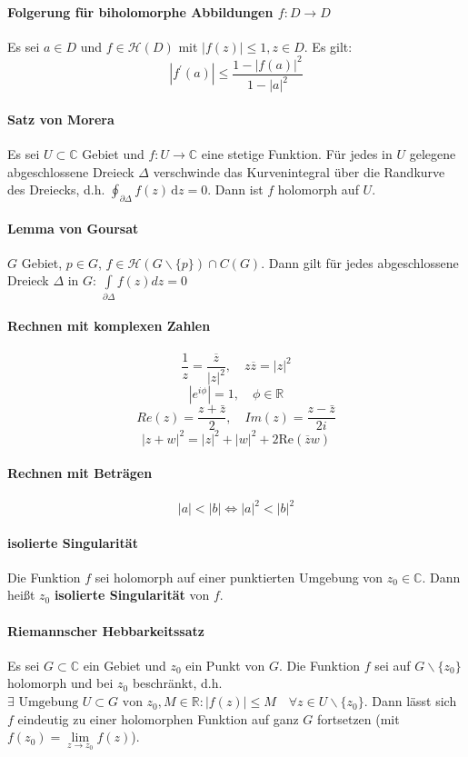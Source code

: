 \documentclass[a4paper, 10pt, DIV20, headings=small]{scrartcl}
\theoremstyle{definition}
\theoremstyle{plain}
\begin{document}
\paragraph{Folgerung für biholomorphe Abbildungen $f \colon D \rightarrow D$}
Es sei $a \in D$ und $f \in \mathcal{H}(D)$ mit $|f(z)| \leq 1, z \in D$. Es gilt:
$$|f^\prime(a)| \leq \frac{1 - |f(a)|^2}{1 - |a|^2}$$

\paragraph{Satz von Morera}
Es sei $U \subset \mathbb{C}$ Gebiet und $f \colon U \rightarrow \mathbb{C}$ eine stetige Funktion. Für jedes in $U$ gelegene abgeschlossene Dreieck $\Delta$ verschwinde das Kurvenintegral über die Randkurve des Dreiecks, d.h. $\oint_{\partial\Delta} f(z)\, \mathrm{d}z = 0$. Dann ist $f$ holomorph auf $U$.

\paragraph{Lemma von Goursat}
$G$ Gebiet, $p \in G$, $f \in \mathcal{H}(G \backslash\{p\}) \cap C(G)$. Dann gilt für jedes abgeschlossene Dreieck $\Delta$ in $G$:
$\int\limits_{\partial \Delta}{f(z)dz} = 0$

\paragraph{Rechnen mit komplexen Zahlen}
$$\frac{1}{z} = \frac{\overline{z}}{|z|^2}, \quad z \overline{z} = |z|^2$$
$$|e^{i \phi}| = 1, \quad \phi \in \mathbb{R}$$
$$Re(z) = \frac{z+\bar{z}}{2}, \quad Im(z) = \frac{z-\bar{z}}{2i}$$
$$|z+w|^2 = |z|^2+|w|^2 + 2 \text{Re}(\overline{z}w)$$

\paragraph{Rechnen mit Beträgen}
$$|a| < |b| \Leftrightarrow |a|^2 < |b|^2$$

\paragraph{isolierte Singularität}
Die Funktion $f$ sei holomorph auf einer punktierten Umgebung von
$z_0 \in \mathbb{C}$. Dann heißt $z_0$ \textbf{isolierte Singularität} von $f$. 

\paragraph{Riemannscher Hebbarkeitssatz}
Es sei $G \subset \mathbb{C}$ ein Gebiet und $z_0$ ein Punkt von $G$. Die Funktion $f$ sei auf $G \backslash \{z_0\}$ holomorph und bei $z_0$ beschränkt, d.h. $\exists \text{ Umgebung } U \subset G \text{ von } z_0, M \in \mathbb{R} \colon |f(z)| \leq M \quad \forall z \in U \backslash \{z_0\}$. Dann lässt sich $f$ eindeutig zu einer holomorphen Funktion auf ganz $G$ fortsetzen (mit $f(z_0) = \lim\limits_{z \rightarrow z_0} f(z)$).
\end{document}
